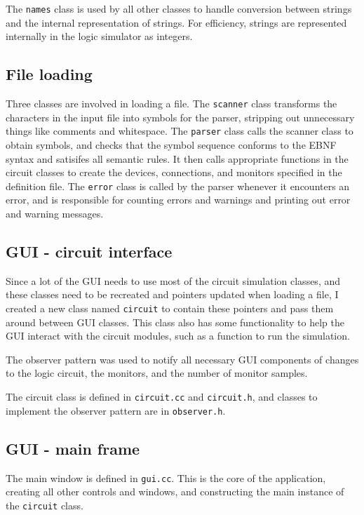 \documentclass[a4paper,10pt]{article}
\begin{document}
The \texttt{names} class is used by all other classes to handle conversion between strings and the internal representation of strings. For efficiency, strings are represented internally in the logic simulator as integers. 

\subsection{File loading}
Three classes are involved in loading a file. The \texttt{scanner} class transforms the characters in the input file into symbols for the parser, stripping out unnecessary things like comments and whitespace. The \texttt{parser} class calls the scanner class to obtain symbols, and checks that the symbol sequence conforms to the EBNF syntax and satisifes all semantic rules. It then calls appropriate functions in the circuit classes to create the devices, connections, and monitors specified in the definition file. The \texttt{error} class is called by the parser whenever it encounters an error, and is responsible for counting errors and warnings and printing out error and warning messages. 

\subsection{GUI - circuit interface}
Since a lot of the GUI needs to use most of the circuit simulation classes, and these classes need to be recreated and pointers updated when loading a file, I created a new class named \texttt{circuit} to contain these pointers and pass them around between GUI classes. This class also has some functionality to help the GUI interact with the circuit modules, such as a function to run the simulation. 

The observer pattern was used to notify all necessary GUI components of changes to the logic circuit, the monitors, and the number of monitor samples. 

The circuit class is defined in \texttt{circuit.cc} and \texttt{circuit.h}, and classes to implement the observer pattern are in \texttt{observer.h}. 

\subsection{GUI - main frame}
The main window is defined in \texttt{gui.cc}. This is the core of the application, creating all other controls and windows, and constructing the main instance of the \texttt{circuit} class. 
\end{document}
